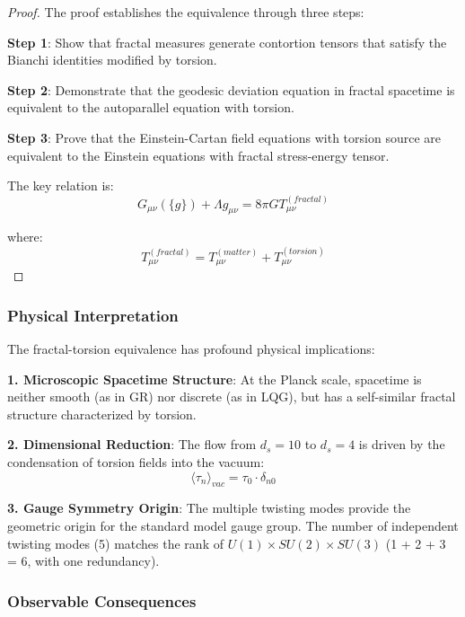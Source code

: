 \begin{proof}
The proof establishes the equivalence through three steps:

\textbf{Step 1}: Show that fractal measures generate contortion tensors that satisfy the Bianchi identities modified by torsion.

\textbf{Step 2}: Demonstrate that the geodesic deviation equation in fractal spacetime is equivalent to the autoparallel equation with torsion.

\textbf{Step 3}: Prove that the Einstein-Cartan field equations with torsion source are equivalent to the Einstein equations with fractal stress-energy tensor.

The key relation is:
\begin{equation}
    G_{\mu\nu}(\{g\}) + \Lambda g_{\mu\nu} = 8\pi G T_{\mu\nu}^{(fractal)}
\end{equation}

where:
\begin{equation}
    T_{\mu\nu}^{(fractal)} = T_{\mu\nu}^{(matter)} + T_{\mu\nu}^{(torsion)}
\end{equation}
\end{proof}

\subsubsection{Physical Interpretation}

The fractal-torsion equivalence has profound physical implications:

\textbf{1. Microscopic Spacetime Structure}: At the Planck scale, spacetime is neither smooth (as in GR) nor discrete (as in LQG), but has a self-similar fractal structure characterized by torsion.

\textbf{2. Dimensional Reduction}: The flow from $d_s = 10$ to $d_s = 4$ is driven by the condensation of torsion fields into the vacuum:
\begin{equation}
    \langle \tau_n \rangle_{vac} = \tau_0 \cdot \delta_{n0}
\end{equation}

\textbf{3. Gauge Symmetry Origin}: The multiple twisting modes provide the geometric origin for the standard model gauge group. The number of independent twisting modes (5) matches the rank of $U(1) \times SU(2) \times SU(3)$ (1 + 2 + 3 = 6, with one redundancy).

\subsubsection{Observable Consequences}

